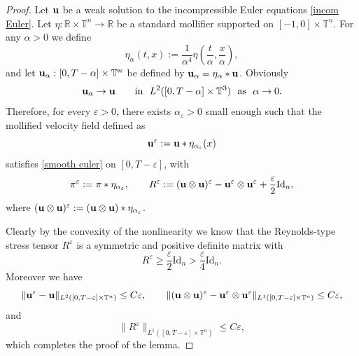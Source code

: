 \documentclass[12pt,reqno]{amsart}
\theoremstyle{definition}
\theoremstyle{remark}
\numberwithin{equation}{section}
\renewcommand{\u}{{\bf u}}
\newcommand{\R}{{\mathbb R}}
\newcommand{\T}{{\mathbb T}}
\newcommand{\id}{\mathrm{Id}}
\newcommand{\eps}{{\varepsilon}}
\begin{document}
\begin{proof} Let $\u$ be a weak solution to the incompressible Euler equations \eqref{incom Euler}. Let $\eta : \R \times \T^n \to \R$ be a standard mollifier supported on $[-1,0] \times \T^n$. For any $\alpha > 0$ we define
\[
\eta_\alpha(t,x) := \frac{1}{\alpha^4}\eta\left( \frac{t}{\alpha}, \frac{x}{\alpha} \right),
\]
and let $\u_\alpha : [0, T - \alpha] \times \T^n$ be defined by $\u_\alpha = \eta_\alpha \ast \u$. Obviously 
\[
\u_\alpha \to \u \qquad \text{in } \ L^2([0,T-\alpha] \times\mathbb {T}^3) \ \text{ as } \ \alpha \to 0.
\]
Therefore, for every $\varepsilon>0$, there exists $\alpha_\varepsilon>0$ small enough such that 
 the mollified velocity field defined as 
 $$
 \u^{\varepsilon} := \u*\eta_{\alpha_\varepsilon}(x)
 $$
 satisfies \eqref{smooth euler} on $[0, T - \eps]$, with
 \[
 \pi^\varepsilon := \pi \ast \eta_{\alpha_\varepsilon}, \qquad R^{\varepsilon} :=(\u\otimes\u)^{\varepsilon}-\u^{\varepsilon}\otimes \u^{\varepsilon}+\frac{\varepsilon}{2} \id_n,
 \]
where $(\u\otimes\u)^{\varepsilon} : = (\u\otimes\u) \ast \eta_{\alpha_\varepsilon}$.
 
Clearly by the convexity of the nonlinearity we know that the Reynolds-type stress tensor $ R^{\varepsilon}$ is a symmetric and positive definite matrix with 
\[
R^{\varepsilon} \ge \frac{\varepsilon}{2} \id_n > \frac{\varepsilon}{4} \id_n.
\]
Moreover we have
 $$
 \|\u^{\varepsilon}-\u\|_{L^2([0,T - \eps] \times \mathbb{T}^n)}\leq C \varepsilon,\qquad 
 \|(\u\otimes \u)^{\varepsilon}-\u^\eps \otimes \u^\eps\|_{L^1([0,T -\eps] \times \mathbb{T}^n)} \leq C \varepsilon,
 $$
 and 
$$
\|R^{\varepsilon}\|_{L^1([0,T - \eps] \times \mathbb{T}^n)}\leq C \varepsilon,
$$
which completes the proof of the lemma. 
\end{proof}

\smallskip
\end{document}

